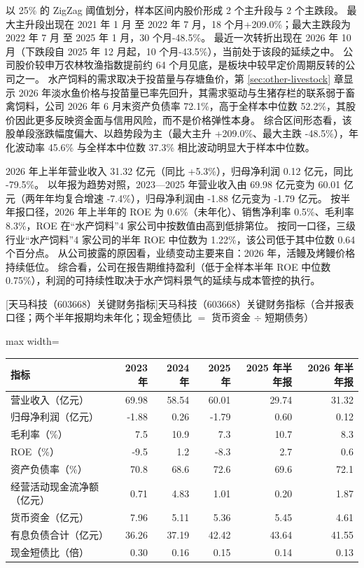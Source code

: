  以 25\% 的 ZigZag 阈值划分，样本区间内股价形成 2 个主升段与 2 个主跌段。 最大主升段出现在 2021 年 1 月 至 2022 年 7 月，18 个月+209.0\%；最大主跌段为 2022 年 7 月 至 2025 年 1 月，30 个月-48.5\%。 最近一次转折出现在 2026 年 10 月（下跌段自 2025 年 12 月起，10 个月-43.5\%），当前处于该段的延续之中。 公司股价较申万农林牧渔指数提前约 64 个月见底，是板块中较早定价周期反转的公司之一。 水产饲料的需求取决于投苗量与存塘鱼价，第 \ref{sec:other-livestock} 章显示 2026 年淡水鱼价格与投苗量已率先回升，其需求驱动与生猪存栏的联系弱于畜禽饲料，公司 2026 年 6 月末资产负债率 72.1\%，高于全样本中位数 52.2\%，其股价因此更多反映资金面与信用风险，而不是价格弹性本身。 综合区间形态看，该股单段涨跌幅度偏大、以趋势段为主（最大主升 +209.0\%、最大主跌 -48.5\%），年化波动率 45.6\% 与全样本中位数 37.3\% 相比波动明显大于样本中位数。

 2026 年上半年营业收入 31.32 亿元（同比 +5.3\%），归母净利润 0.12 亿元，同比 -79.5\%。 以年报为趋势对照，2023---2025 年营业收入由 69.98 亿元变为 60.01 亿元（两年年均复合增速 -7.4\%），归母净利润由 -1.88 亿元变为 -1.79 亿元。 按半年报口径，2026 年上半年的 ROE 为 0.6\%（未年化）、销售净利率 0.5\%、毛利率 8.3\%，ROE 在“水产饲料”4 家公司中按数值由高到低排第位。 按同一口径，三级行业“水产饲料”4 家公司的半年 ROE 中位数为 1.22\%，该公司低于其中位数 0.64 个百分点。 从公司披露的原因看，业绩变动主要来自：2026 年，活鳗及烤鳗价格持续低位。 综合看，公司在报告期维持盈利（低于全样本半年 ROE 中位数 0.75\%），利润的可持续性取决于水产饲料景气的延续与成本管控的执行。

\begin{center}\small\setlength{\tabcolsep}{3.4pt}
[天马科技（603668）关键财务指标]{天马科技（603668）关键财务指标（合并报表口径；两个半年报期均未年化；现金短债比 $=$ 货币资金 $\div$ 短期债务）}
\begin{adjustbox}{max width=\textwidth}
\begin{tabular}{@{}lrrrrr@{}}
\toprule
指标 & 2023 年 & 2024 年 & 2025 年 & 2025 年半年报 & 2026 年半年报 \\
\midrule
营业收入（亿元） & 69.98 & 58.54 & 60.01 & 29.74 & 31.32 \\
归母净利润（亿元） & -1.88 & 0.26 & -1.79 & 0.60 & 0.12 \\
毛利率（\%） & 7.5 & 10.9 & 7.3 & 10.7 & 8.3 \\
ROE（\%） & -9.5 & 1.2 & -8.3 & 2.7 & 0.6 \\
资产负债率（\%） & 70.8 & 68.6 & 72.6 & 69.6 & 72.1 \\
经营活动现金流净额（亿元） & 0.71 & 4.83 & 1.01 & 0.20 & 1.87 \\
货币资金（亿元） & 7.96 & 5.11 & 5.36 & 5.45 & 4.61 \\
有息负债合计（亿元） & 36.26 & 37.19 & 42.42 & 43.64 & 41.55 \\
现金短债比（倍） & 0.30 & 0.16 & 0.15 & 0.14 & 0.13 \\
\bottomrule
\end{tabular}
\end{adjustbox}
\end{center}

